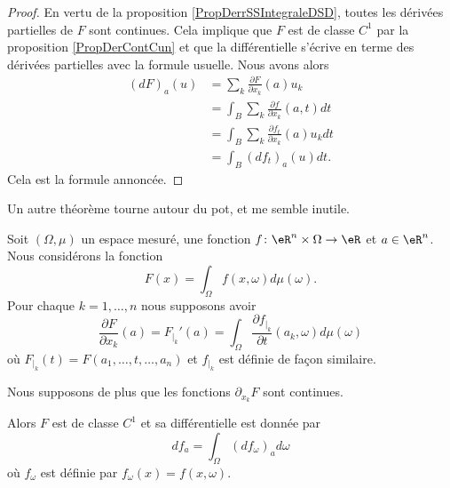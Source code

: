 \begin{proof}
    En vertu de la proposition \ref{PropDerrSSIntegraleDSD}, toutes les dérivées partielles de \( F\) sont continues. Cela implique que \( F\) est de classe \( C^1\) par la proposition \ref{PropDerContCun} et que la différentielle s'écrive en terme des dérivées partielles avec la formule usuelle. Nous avons alors
    \begin{subequations}
        \begin{align}
            (dF)_a(u)&=\sum_k\frac{ \partial F }{ \partial x_k }(a)u_k\\
            &=\int_B\sum_k\frac{ \partial f }{ \partial x_k }(a,t)dt\\
            &=\int_B\sum_k\frac{ \partial f_t }{ \partial x_k }(a)u_kdt\\
            &=\int_B (df_t)_a(u)dt.
        \end{align}
    \end{subequations}
    Cela est la formule annoncée.
\end{proof}

Un autre théorème tourne autour du pot, et me semble inutile.
\begin{theorem} \label{ThoOLAQyRL}
    Soit \( (\Omega,\mu)\) un espace mesuré, une fonction \( f\colon \eR^n\times \Omega\to \eR\) et \( a\in \eR^n\). Nous considérons la fonction
    \begin{equation}
        F(x)=\int_{\Omega}f(x,\omega)d\mu(\omega).
    \end{equation}
    Pour chaque \( k=1,\ldots, n\) nous supposons avoir
    \begin{equation}
        \frac{ \partial F }{ \partial x_k }(a)=F_{|_k}'(a)=\int_{\Omega}\frac{ \partial f_{|_k} }{ \partial t }(a_k,\omega)d\mu(\omega)
    \end{equation}
    où \( F_{|_k}(t)=F(a_1,\ldots, t,\ldots, a_n)\) et \( f_{|_k}\) est définie de façon similaire.

    Nous supposons de plus que les fonctions \( \partial_{x_k}F\) sont continues.

    Alors \( F\) est de classe \( C^1\) et sa différentielle est donnée par
    \begin{equation}
        df_a=\int_{\Omega}(df_{\omega})_ad\omega
    \end{equation}
    où \( f_{\omega}\) est définie par \( f_{\omega}(x)=f(x,\omega)\).
\end{theorem}

